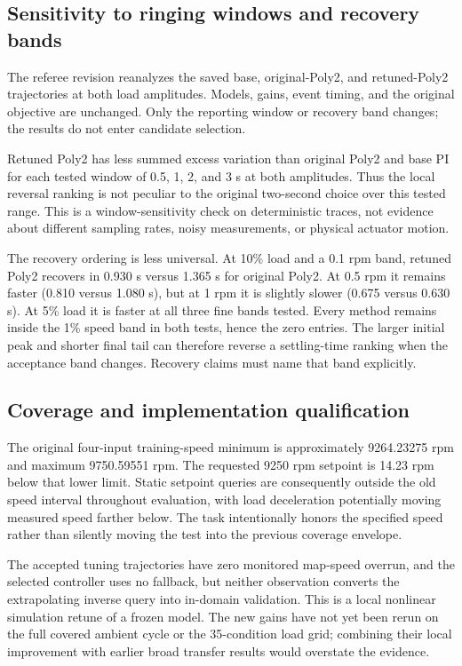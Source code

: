 \subsection{Sensitivity to ringing windows and recovery bands}
\label{sec:sensitivity}
The referee revision reanalyzes the saved base, original-Poly2, and retuned-Poly2 trajectories at both load amplitudes. Models, gains, event timing, and the original objective are unchanged. Only the reporting window or recovery band changes; the results do not enter candidate selection.

Retuned Poly2 has less summed excess variation than original Poly2 and base PI for each tested window of 0.5, 1, 2, and 3 s at both amplitudes. Thus the local reversal ranking is not peculiar to the original two-second choice over this tested range. This is a window-sensitivity check on deterministic traces, not evidence about different sampling rates, noisy measurements, or physical actuator motion.

The recovery ordering is less universal. At 10\% load and a 0.1 rpm band, retuned Poly2 recovers in 0.930 s versus 1.365 s for original Poly2. At 0.5 rpm it remains faster (0.810 versus 1.080 s), but at 1 rpm it is slightly slower (0.675 versus 0.630 s). At 5\% load it is faster at all three fine bands tested. Every method remains inside the 1\% speed band in both tests, hence the zero entries. The larger initial peak and shorter final tail can therefore reverse a settling-time ranking when the acceptance band changes. Recovery claims must name that band explicitly.

\subsection{Coverage and implementation qualification}
The original four-input training-speed minimum is approximately 9264.23275 rpm and maximum 9750.59551 rpm. The requested 9250 rpm setpoint is 14.23 rpm below that lower limit. Static setpoint queries are consequently outside the old speed interval throughout evaluation, with load deceleration potentially moving measured speed farther below. The task intentionally honors the specified speed rather than silently moving the test into the previous coverage envelope.

The accepted tuning trajectories have zero monitored map-speed overrun, and the selected controller uses no fallback, but neither observation converts the extrapolating inverse query into in-domain validation. This is a local nonlinear simulation retune of a frozen model. The new gains have not yet been rerun on the full covered ambient cycle or the 35-condition load grid; combining their local improvement with earlier broad transfer results would overstate the evidence.

